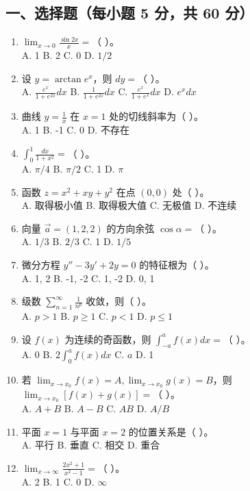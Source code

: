\documentclass[11pt,a4paper]{article}
\begin{document}
\subsection*{一、选择题（每小题 5 分，共 60 分）}
\begin{enumerate}
    \item $\lim_{x \to 0} \frac{\sin 2x}{x} = $（ ）。 \\
    A. 1 \quad B. 2 \quad C. 0 \quad D. $1/2$
    \item 设 $y = \arctan e^x$，则 $dy = $（ ）。 \\
    A. $\frac{e^x}{1+e^{2x}} dx$ \quad B. $\frac{1}{1+e^{2x}} dx$ \quad C. $\frac{e^x}{1+e^x} dx$ \quad D. $e^x dx$
    \item 曲线 $y = \frac{1}{x}$ 在 $x=1$ 处的切线斜率为（ ）。 \\
    A. 1 \quad B. -1 \quad C. 0 \quad D. 不存在
    \item $\int_0^1 \frac{dx}{1+x^2} = $（ ）。 \\
    A. $\pi/4$ \quad B. $\pi/2$ \quad C. 1 \quad D. $\pi$
    \item 函数 $z = x^2 + xy + y^2$ 在点 $(0,0)$ 处（ ）。 \\
    A. 取得极小值 \quad B. 取得极大值 \quad C. 无极值 \quad D. 不连续
    \item 向量 $\vec{a}=(1,2,2)$ 的方向余弦 $\cos \alpha = $（ ）。 \\
    A. $1/3$ \quad B. $2/3$ \quad C. 1 \quad D. $1/5$
    \item 微分方程 $y'' - 3y' + 2y = 0$ 的特征根为（ ）。 \\
    A. 1, 2 \quad B. -1, -2 \quad C. 1, -2 \quad D. 0, 1
    \item 级数 $\sum_{n=1}^{\infty} \frac{1}{n^p}$ 收敛，则（ ）。 \\
    A. $p > 1$ \quad B. $p \ge 1$ \quad C. $p < 1$ \quad D. $p \le 1$
    \item 设 $f(x)$ 为连续的奇函数，则 $\int_{-a}^a f(x) dx = $（ ）。 \\
    A. 0 \quad B. $2\int_0^a f(x) dx$ \quad C. $a$ \quad D. 1
    \item 若 $\lim_{x \to x_0} f(x) = A, \lim_{x \to x_0} g(x) = B$，则 $\lim_{x \to x_0} [f(x)+g(x)] = $（ ）。 \\
    A. $A+B$ \quad B. $A-B$ \quad C. $AB$ \quad D. $A/B$
    \item 平面 $x=1$ 与平面 $x=2$ 的位置关系是（ ）。 \\
    A. 平行 \quad B. 垂直 \quad C. 相交 \quad D. 重合
    \item $\lim_{x \to \infty} \frac{2x^2+1}{x^2-1} = $（ ）。 \\
    A. 2 \quad B. 1 \quad C. 0 \quad D. $\infty$
\end{enumerate}
\end{document}
